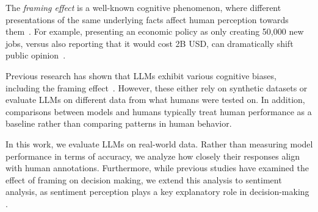 









The \textit{framing effect} is a well-known cognitive phenomenon, where different presentations of the same underlying facts affect human perception towards them~\citep{tversky1981framing}.
For example, presenting an economic policy as only creating 50,000 new jobs, versus also reporting that it would cost 2B USD, can dramatically shift public opinion~\cite{sniderman2004structure}. 



Previous research has shown that LLMs exhibit various cognitive biases, including the framing effect~\cite{lore2024strategic,shaikh2024cbeval,malberg2024comprehensive,echterhoff-etal-2024-cognitive}. However, these either rely on synthetic datasets or evaluate LLMs on different data from what humans were tested on. In addition, comparisons between models and humans typically treat human performance as a baseline rather than comparing patterns in human behavior. 

In this work, we evaluate LLMs on real-world data. Rather than measuring model performance in terms of accuracy, we analyze how closely their responses align with human annotations. Furthermore, while previous studies have examined the effect of framing on decision making, we extend this analysis to sentiment analysis, as sentiment perception plays a key explanatory role in decision-making \cite{lerner2015emotion}. 

